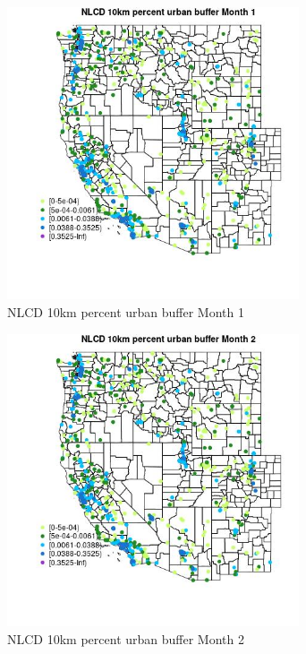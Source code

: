 \begin{figure} 
\centering  
\includegraphics[width=0.77\textwidth]{Code_Outputs/Report_ML_input_PM25_Step4_part_f_de_duplicated_aveswNAs_MapObsMo1NLCD_10km_percent_urban_buffer.jpg} 
\caption{\label{fig:Report_ML_input_PM25_Step4_part_f_de_duplicated_aveswNAsMapObsMo1NLCD_10km_percent_urban_buffer}NLCD 10km percent urban buffer Month 1} 
\end{figure} 
 

\begin{figure} 
\centering  
\includegraphics[width=0.77\textwidth]{Code_Outputs/Report_ML_input_PM25_Step4_part_f_de_duplicated_aveswNAs_MapObsMo2NLCD_10km_percent_urban_buffer.jpg} 
\caption{\label{fig:Report_ML_input_PM25_Step4_part_f_de_duplicated_aveswNAsMapObsMo2NLCD_10km_percent_urban_buffer}NLCD 10km percent urban buffer Month 2} 
\end{figure} 
 

